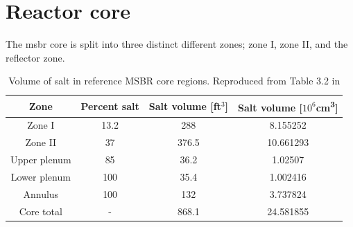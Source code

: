 \section{Reactor core}
\label{sec:msbr-core}
The \Gls{msbr} core is split into three distinct different zones; zone I, zone
II, and the reflector zone. 

\begin{table}[htpb]
    \centering
    \caption[Volume of salt in reference MSBR core regions]{Volume of salt in
reference MSBR core regions. Reproduced from Table 3.2 in
\cite{robertson_conceptual_1971}}
    \label{tab:salt-volumes}
    \begin{tabular}{|c|c|cc|}
        \hline
        Zone & Percent salt & Salt volume [ft$^3$] & Salt volume [$10^6$\unit{\centi\metre\cubed}] \\
        \hline
        Zone I & 13.2 & 288 & 8.155252 \\
        \hline
        Zone II & 37 & 376.5 & 10.661293 \\
        \hline
        Upper plenum & 85 & 36.2 & 1.02507 \\ 
        \hline
        Lower plenum & 100 & 35.4 & 1.002416 \\ 
        \hline
        Annulus & 100 &  132 & 3.737824\\
        \hline
        Core total & - & 868.1 & 24.581855 \\ 
        \hline
    \end{tabular}
\end{table}

